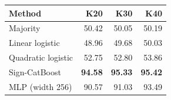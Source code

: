 \begin{tabular}{lrrr}\toprule
Method & K20 & K30 & K40 \\\midrule
Majority & 50.42 & 50.05 & 50.19 \\
Linear logistic & 48.96 & 49.68 & 50.03 \\
Quadratic logistic & 52.75 & 52.80 & 53.86 \\
Sign-CatBoost & \textbf{94.58} & \textbf{95.33} & \textbf{95.42} \\
MLP (width 256) & 90.57 & 91.03 & 93.49 \\
\bottomrule
\end{tabular}
